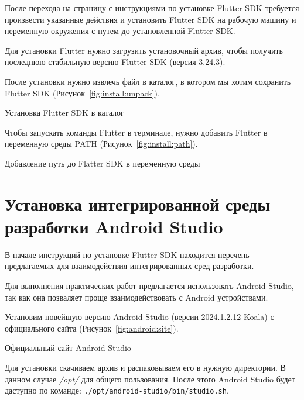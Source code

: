 После перехода на страницу с инструкциями по установке
Flutter SDK требуется произвести указанные действия
и установить Flutter SDK на рабочую машину
и переменную окружения с путем до установленной Flutter SDK.\par
Для установки Flutter нужно загрузить установочный архив,
чтобы получить последнюю стабильную версию Flutter SDK (версия 3.24.3).\par
После установки нужно извлечь файл в каталог,
в котором мы хотим сохранить Flutter SDK (Рисунок~\ref{fig:install:unpack}).

\begin{image}
	\caption{Установка Flutter SDK в каталог}
	\label{fig:install:unpack}
\end{image}

Чтобы запускать команды Flutter в терминале,
нужно добавить Flutter в переменную среды PATH
(Рисунок~\ref{fig:install:path}).

\begin{image}
	\caption{Добавление путь до Flatter SDK в переменную среды}
	\label{fig:install:path}
\end{image}

\section{Установка интегрированной среды разработки Android Studio}

В начале инструкций по установке Flutter SDK находится перечень предлагаемых
для взаимодействия интегрированных сред разработки.\par
Для выполнения практических работ предлагается использовать Android Studio,
так как она позваляет проще взаимодействовать с Android устройствами.\par

Установим новейшую версию Android Studio (версии 2024.1.2.12 Koala)
с официального сайта (Рисунок~\ref{fig:android:site}).

\begin{image}
	\caption{Официальный сайт Android Studio}
	\label{fig:android:site}
\end{image}

Для установки скачиваем архив и распаковываем его в нужную директории.
В данном случае \textit{/opt/} для общего пользования.
После этого Android Studio будет даступно по команде:
\texttt{./opt/android-studio/bin/studio.sh}.

